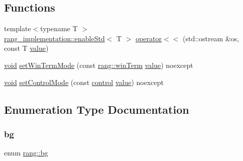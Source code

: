 \subsection*{Functions}
\begin{DoxyCompactItemize}
\item 
{\footnotesize template$<$typename T $>$ }\\\mbox{\hyperlink{namespacerang_1_1rang__implementation_a769f245caecc8bdf2d741f39a48052ac}{rang\+\_\+implementation\+::enable\+Std}}$<$ T $>$ \mbox{\hyperlink{namespacerang_a201ef75295a5330197a374ac999a9e8a}{operator$<$$<$}} (std\+::ostream \&os, const T \mbox{\hyperlink{glad_8h_a7ab00df62abe96de01795dc0d15959db}{value}})
\item 
\mbox{\hyperlink{glad_8h_a950fc91edb4504f62f1c577bf4727c29}{void}} \mbox{\hyperlink{namespacerang_a34533a6f3dc063a47816a626f8f4d6c0}{set\+Win\+Term\+Mode}} (const \mbox{\hyperlink{namespacerang_af70222b38ecff8fc5aef0958d052b433}{rang\+::win\+Term}} \mbox{\hyperlink{glad_8h_a7ab00df62abe96de01795dc0d15959db}{value}}) noexcept
\item 
\mbox{\hyperlink{glad_8h_a950fc91edb4504f62f1c577bf4727c29}{void}} \mbox{\hyperlink{namespacerang_ae72965d5fd9f42ddf3bc7101d3e2f423}{set\+Control\+Mode}} (const \mbox{\hyperlink{namespacerang_a9a0ad8048ed47f032f5bdb687ba64164}{control}} \mbox{\hyperlink{glad_8h_a7ab00df62abe96de01795dc0d15959db}{value}}) noexcept
\end{DoxyCompactItemize}


\subsection{Enumeration Type Documentation}
\mbox{\label{namespacerang_ad33ed681a0b63f07283bbb55d19da7d2}} 
\subsubsection{\texorpdfstring{bg}{bg}}
{\footnotesize\ttfamily enum \mbox{\hyperlink{namespacerang_ad33ed681a0b63f07283bbb55d19da7d2}{rang\+::bg}}\hspace{0.3cm}{\ttfamily [strong]}}

